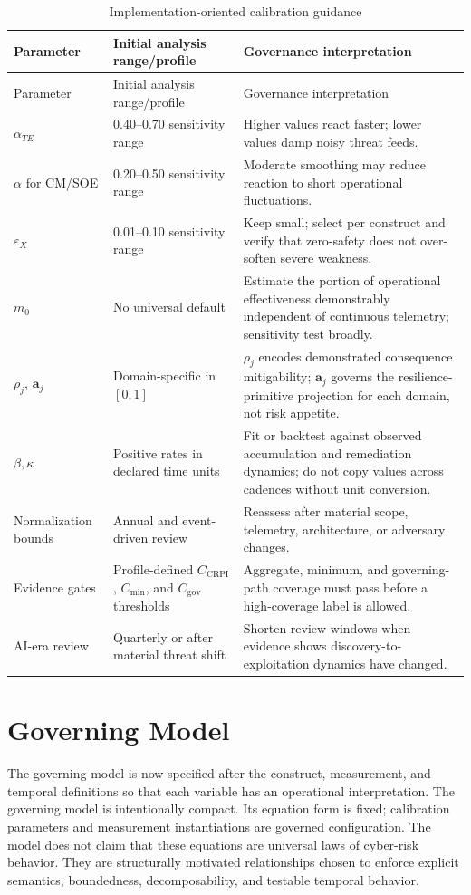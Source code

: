 \documentclass[11pt]{article}
\begin{document}
\begingroup
\small
\setlength{\tabcolsep}{5pt}
\renewcommand{\arraystretch}{1.15}
\begin{longtable}{P{0.18\textwidth} P{0.27\textwidth} P{0.45\textwidth}}
  \caption{Implementation-oriented calibration guidance}
  \label{tab:calibration-guidance}\\
  \toprule
  Parameter & Initial analysis range/profile & Governance interpretation \\
  \midrule
  \endfirsthead
  \toprule
  Parameter & Initial analysis range/profile & Governance interpretation \\
  \midrule
  \endhead
  $\alpha_{TE}$ & 0.40--0.70 sensitivity range & Higher values react faster; lower values damp noisy threat feeds. \\
  $\alpha$ for CM/SOE & 0.20--0.50 sensitivity range & Moderate smoothing may reduce reaction to short operational fluctuations. \\
  $\varepsilon_X$ & 0.01--0.10 sensitivity range & Keep small; select per construct and verify that zero-safety does not over-soften severe weakness. \\
  $m_0$ & No universal default & Estimate the portion of operational effectiveness demonstrably independent of continuous telemetry; sensitivity test broadly. \\
  $\rho_j$, $\mathbf{a}_j$ & Domain-specific in $[0,1]$ & $\rho_j$ encodes demonstrated consequence mitigability; $\mathbf{a}_j$ governs the resilience-primitive projection for each domain, not risk appetite. \\
  $\beta,\kappa$ & Positive rates in declared time units & Fit or backtest against observed accumulation and remediation dynamics; do not copy values across cadences without unit conversion. \\
  Normalization bounds & Annual and event-driven review & Reassess after material scope, telemetry, architecture, or adversary changes. \\
  Evidence gates & Profile-defined $\bar C_{\mathrm{CRPI}}$, $C_{\min}$, and $C_{\mathrm{gov}}$ thresholds & Aggregate, minimum, and governing-path coverage must pass before a high-coverage label is allowed. \\
  AI-era review & Quarterly or after material threat shift & Shorten review windows when evidence shows discovery-to-exploitation dynamics have changed. \\
  \bottomrule
\end{longtable}
\endgroup

\section{Governing Model}
\label{sec:governing}
The governing model is now specified after the construct, measurement, and temporal definitions so that each variable has an operational interpretation. The governing model is intentionally compact. Its equation form is fixed; calibration
parameters and measurement instantiations are governed configuration. The model does
not claim that these equations are universal laws of cyber-risk behavior. They are
structurally motivated relationships chosen to enforce explicit semantics, boundedness,
decomposability, and testable temporal behavior.
\end{document}
